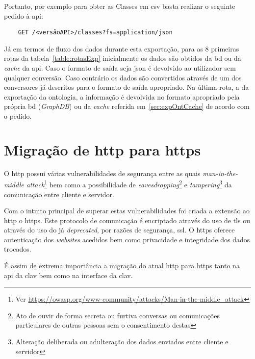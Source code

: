 Portanto, por exemplo para obter as Classes em \acrshort{csv} basta realizar o seguinte pedido à \acrshort{api}:
\footnotesize
\begin{verbatim}
    GET /<versãoAPI>/classes?fs=application/json
\end{verbatim}
\normalsize

Já em termos de fluxo dos dados durante esta exportação, para as 8 primeiras rotas da tabela~\ref{table:rotasExp} inicialmente os dados são obtidos da \acrshort{bd} ou da \textit{cache} da \acrshort{api}. Caso o formato de saída seja \acrshort{json} é devolvido ao utilizador sem qualquer conversão. Caso contrário os dados são convertidos através de um dos conversores já descritos para o formato de saída apropriado. Na última rota, a da exportação da ontologia, a informação é devolvida no formato apropriado pela própria \acrshort{bd} (\textit{GraphDB}) ou da \textit{cache} referida em~\ref{sec:expOntCache} de acordo com o pedido.

\section{Migração de \acrshort{http} para \acrshort{https}}

O \acrfull{http} possui várias vulnerabilidades de segurança entre as quais \textit{man-in-the-middle attack}\footnote{Ver \url{https://owasp.org/www-community/attacks/Man-in-the-middle_attack}} bem como a possibilidade de \textit{eavesdropping}\footnote{Ato de ouvir de forma secreta ou furtiva conversas ou comunicações particulares de outras pessoas sem o consentimento destas} e \textit{tampering}\footnote{Alteração deliberada ou adulteração dos dados enviados entre cliente e servidor} da comunicação entre cliente e servidor.

Com o intuito principal de superar estas vulnerabilidades foi criada a extensão ao \acrshort{http} o \acrfull{https}. Este protocolo de comunicação é encriptado através do uso de \acrfull{tls} ou através do uso do já \textit{deprecated}, por razões de segurança, \acrfull{ssl}. O \acrshort{https} oferece autenticação dos \textit{websites} acedidos bem como privacidade e integridade dos dados trocados.

É assim de extrema importância a migração do atual \acrshort{http} para \acrshort{https} tanto na \acrshort{api} da \acrshort{clav} bem como na interface da \acrshort{clav}.

